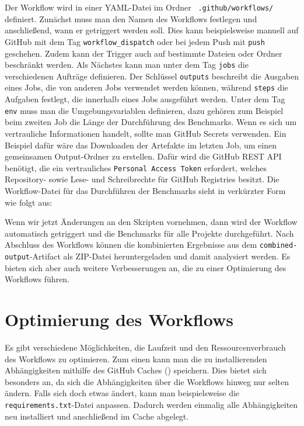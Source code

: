 Der Workflow wird in einer YAML-Datei im Ordner ~\texttt{.github/workflows/} definiert.
Zunächst muss man den Namen des Workflows festlegen und anschließend, wann er getriggert werden soll.
Dies kann beispielsweise manuell auf GitHub mit dem Tag \texttt{workflow\_dispatch} oder bei jedem Push mit \texttt{push} geschehen.
Zudem kann der Trigger auch auf bestimmte Dateien oder Ordner beschränkt werden.
Als Nächstes kann man unter dem Tag \texttt{jobs} die verschiedenen Aufträge definieren.
Der Schlüssel \texttt{outputs} beschreibt die Ausgaben eines Jobs, die von anderen Jobs verwendet werden können, während \texttt{steps} die Aufgaben festlegt, die innerhalb eines Jobs ausgeführt werden.
Unter dem Tag \texttt{env} muss man die Umgebungsvariablen definieren, dazu gehören zum Beispiel beim zweiten Job die Länge der Durchführung des Benchmarks.
Wenn es sich um vertrauliche Informationen handelt, sollte man GitHub Secrets verwenden.
Ein Beispiel dafür wäre das Downloaden der Artefakte im letzten Job, um einen gemeinsamen Output-Ordner zu erstellen.
Dafür wird die GitHub REST API benötigt, die ein vertrauliches \texttt{Personal Access Token} erfordert, welches Repository- sowie Lese- und Schreibrechte für GitHub Registries besitzt.
Die Workflow-Datei für das Durchführen der Benchmarks sieht in verkürzter Form wie folgt aus:

\vspace{-5pt}

\vspace{-5pt}

Wenn wir jetzt Änderungen an den Skripten vornehmen, dann wird der Workflow automatisch getriggert und die Benchmarks für alle Projekte durchgeführt.
Nach Abschluss des Workflows können die kombinierten Ergebnisse aus dem \texttt{combined-output}-Artifact als ZIP-Datei heruntergeladen und damit analysiert werden.
Es bieten sich aber auch weitere Verbesserungen an, die zu einer Optimierung des Workflows führen.

\section{Optimierung des Workflows}\label{sec:optimierung-des-workflows}

Es gibt verschiedene Möglichkeiten, die Laufzeit und den Ressourcenverbrauch des Workflows zu optimieren.
Zum einen kann man die zu installierenden Abhängigkeiten mithilfe des GitHub Caches (\cite{github_cache_doku}) speichern.
Dies bietet sich besonders an, da sich die Abhängigkeiten über die Workflows hinweg nur selten ändern.
Falls sich doch etwas ändert, kann man beispielsweise die \texttt{require\allowbreak ments.txt}-Datei anpassen.
Dadurch werden einmalig alle Abhängigkeiten neu installiert und anschließend im Cache abgelegt.

